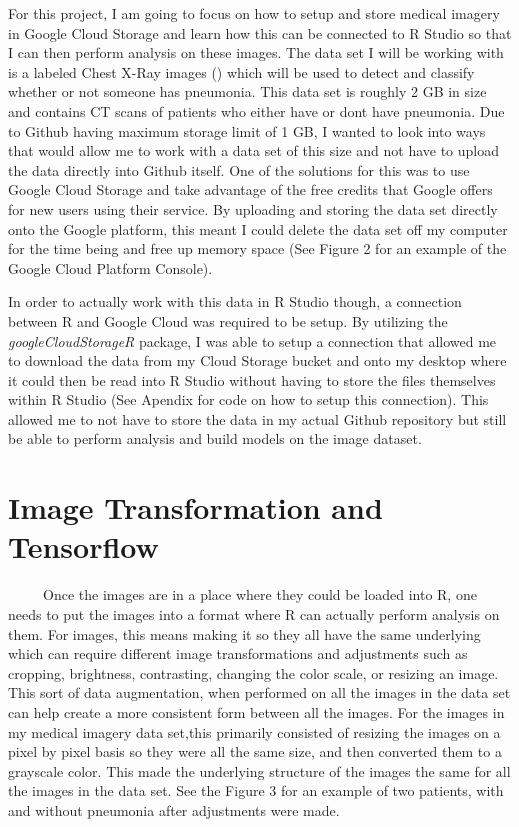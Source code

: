 \documentclass[12pt]{article}
\begin{document}
For this project, I am going to focus on how to setup and store medical
imagery in Google Cloud Storage and learn how this can be connected to R
Studio so that I can then perform analysis on these images. The data set
I will be working with is a labeled Chest X-Ray images (\citet{Medical})
which will be used to detect and classify whether or not someone has
pneumonia. This data set is roughly 2 GB in size and contains CT scans
of patients who either have or dont have pneumonia. Due to Github having
maximum storage limit of 1 GB, I wanted to look into ways that would
allow me to work with a data set of this size and not have to upload the
data directly into Github itself. One of the solutions for this was to
use Google Cloud Storage and take advantage of the free credits that
Google offers for new users using their service. By uploading and
storing the data set directly onto the Google platform, this meant I
could delete the data set off my computer for the time being and free up
memory space (See Figure 2 for an example of the Google Cloud Platform
Console).

In order to actually work with this data in R Studio though, a
connection between R and Google Cloud was required to be setup. By
utilizing the \emph{googleCloudStorageR} package, I was able to setup a
connection that allowed me to download the data from my Cloud Storage
bucket and onto my desktop where it could then be read into R Studio
without having to store the files themselves within R Studio (See
Apendix for code on how to setup this connection). This allowed me to
not have to store the data in my actual Github repository but still be
able to perform analysis and build models on the image dataset.

\hypertarget{image-transformation-and-tensorflow}{%
\section{Image Transformation and
Tensorflow}\label{image-transformation-and-tensorflow}}

~~~~~Once the images are in a place where they could be loaded into R,
one needs to put the images into a format where R can actually perform
analysis on them. For images, this means making it so they all have the
same underlying which can require different image transformations and
adjustments such as cropping, brightness, contrasting, changing the
color scale, or resizing an image. This sort of data augmentation, when
performed on all the images in the data set can help create a more
consistent form between all the images. For the images in my medical
imagery data set,this primarily consisted of resizing the images on a
pixel by pixel basis so they were all the same size, and then converted
them to a grayscale color. This made the underlying structure of the
images the same for all the images in the data set. See the Figure 3 for
an example of two patients, with and without pneumonia after adjustments
were made.
\end{document}
